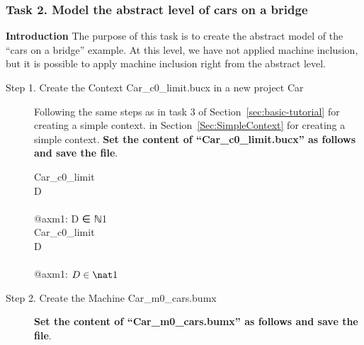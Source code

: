 \subsubsection{Task 2. Model the abstract level of cars on a bridge}
\textbf{Introduction} The purpose of this task is to create the abstract model of the ``cars on a bridge'' example. At this level, we have not applied machine inclusion, but it is possible to apply machine inclusion right from the abstract level. 
\begin{description}
	\item[Step 1. Create the Context Car\_c0\_limit.bucx in a new project Car] 
	Following the same steps as 
	in task 3 of Section~\ref{sec:basic-tutorial} for creating a simple context.  
	\else
	in Section~\ref{Sec:SimpleContext} for creating a simple context.
	\endif
	\textbf{Set the content of ``Car\_c0\_limit.bucx'' as follows and save the file}.
	  
	  \begin{center}
		\begin{Bcode}
			\Bcontext{} Car\_c0_limit\\
			\Bconstants{} D\\
			\Baxioms\\
			@axm1: D ∈ ℕ1\\
			\Bend
			\else
			\Bcontext{} Car_c0_limit\\
			\Bconstants{} D\\
			\Baxioms\\
			\Btab @axm1: \(D \in \nat1\)\\
			\Bend
			\endif
		\end{Bcode}
	\end{center}
	\item[Step 2. Create the Machine Car\_m0\_cars.bumx]\textbf{Set the content of ``Car\_m0\_cars.bumx'' as follows and save the file}.


\end{description}
